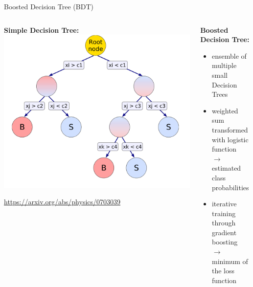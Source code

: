 \documentclass[aspectratio=1610, 10pt]{beamer}
\begin{document}
\begin{frame}{Boosted Decision Tree (BDT)}
  \begin{columns}
    \begin{column}{0.5\textwidth}
      \centering
      \textbf{Simple Decision Tree:}
      \includegraphics[width=\textwidth]{images/decision_tree.png}

      \tiny \url{https://arxiv.org/abs/physics/0703039}
    \end{column}
    \pause
    \begin{column}{0.5\textwidth}
      \textbf{Boosted Decision Tree:}
      \begin{itemize}
        \item ensemble of multiple small Decision Trees
        \item weighted sum transformed with logistic function \\$\rightarrow$ estimated class probabilities
        \item iterative training through gradient boosting \\$\rightarrow$ minimum of the loss function
      \end{itemize}
    \end{column}
  \end{columns}
\end{frame}
\end{document}

